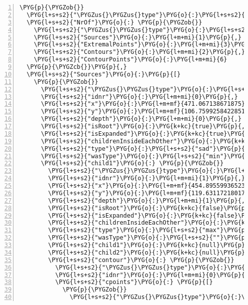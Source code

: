 \begin{Verbatim}[commandchars=\\\{\},numbers=left,stepnumber=1,codes={\catcode`\$=3\catcode`\^=7\catcode`\_=8}]
\PYG{p}{\PYGZob{}}
  \PYG{l+s+s2}{"\PYGZus{}\PYGZus{}type"}\PYG{o}{:}\PYG{l+s+s2}{"model"}\PYG{p}{,}
  \PYG{l+s+s2}{"NrOf"}\PYG{o}{:} \PYG{p}{\PYGZob{}}
    \PYG{l+s+s2}{"\PYGZus{}\PYGZus{}type"}\PYG{o}{:}\PYG{l+s+s2}{"counters"}\PYG{p}{,}
    \PYG{l+s+s2}{"Sources"}\PYG{o}{:}\PYG{l+m+mi}{1}\PYG{p}{,}
    \PYG{l+s+s2}{"ExtremalPoints"}\PYG{o}{:}\PYG{l+m+mi}{3}\PYG{p}{,}
    \PYG{l+s+s2}{"Contours"}\PYG{o}{:}\PYG{l+m+mi}{2}\PYG{p}{,}
    \PYG{l+s+s2}{"ContourPoints"}\PYG{o}{:}\PYG{l+m+mi}{6}
  \PYG{p}{\PYGZcb{}}\PYG{p}{,}
  \PYG{l+s+s2}{"Sources"}\PYG{o}{:}\PYG{p}{[}
    \PYG{p}{\PYGZob{}}
      \PYG{l+s+s2}{"\PYGZus{}\PYGZus{}type"}\PYG{o}{:}\PYG{l+s+s2}{"extpnt"}\PYG{p}{,}
      \PYG{l+s+s2}{"idnr"}\PYG{o}{:}\PYG{l+m+mi}{0}\PYG{p}{,}
      \PYG{l+s+s2}{"x"}\PYG{o}{:}\PYG{l+m+mf}{471.067138671875}\PYG{p}{,}
      \PYG{l+s+s2}{"y"}\PYG{o}{:}\PYG{l+m+mf}{106.75992584228516}\PYG{p}{,}
      \PYG{l+s+s2}{"depth"}\PYG{o}{:}\PYG{l+m+mi}{0}\PYG{p}{,}
      \PYG{l+s+s2}{"isRoot"}\PYG{o}{:}\PYG{k+kc}{true}\PYG{p}{,}
      \PYG{l+s+s2}{"isExpanded"}\PYG{o}{:}\PYG{k+kc}{true}\PYG{p}{,}
      \PYG{l+s+s2}{"childrenInsideEachOther"}\PYG{o}{:}\PYG{k+kc}{true}\PYG{p}{,}
      \PYG{l+s+s2}{"type"}\PYG{o}{:}\PYG{l+s+s2}{"sad"}\PYG{p}{,}
      \PYG{l+s+s2}{"wasType"}\PYG{o}{:}\PYG{l+s+s2}{"min"}\PYG{p}{,}
      \PYG{l+s+s2}{"child1"}\PYG{o}{:} \PYG{p}{\PYGZob{}}
        \PYG{l+s+s2}{"\PYGZus{}\PYGZus{}type"}\PYG{o}{:}\PYG{l+s+s2}{"extpnt"}\PYG{p}{,}
        \PYG{l+s+s2}{"idnr"}\PYG{o}{:}\PYG{l+m+mi}{1}\PYG{p}{,}
        \PYG{l+s+s2}{"x"}\PYG{o}{:}\PYG{l+m+mf}{454.8955993652344}\PYG{p}{,}
        \PYG{l+s+s2}{"y"}\PYG{o}{:}\PYG{l+m+mf}{119.63117218017578}\PYG{p}{,}
        \PYG{l+s+s2}{"depth"}\PYG{o}{:}\PYG{l+m+mi}{1}\PYG{p}{,}
        \PYG{l+s+s2}{"isRoot"}\PYG{o}{:}\PYG{k+kc}{false}\PYG{p}{,}
        \PYG{l+s+s2}{"isExpanded"}\PYG{o}{:}\PYG{k+kc}{false}\PYG{p}{,}
        \PYG{l+s+s2}{"childrenInsideEachOther"}\PYG{o}{:}\PYG{k+kc}{false}\PYG{p}{,}
        \PYG{l+s+s2}{"type"}\PYG{o}{:}\PYG{l+s+s2}{"max"}\PYG{p}{,}
        \PYG{l+s+s2}{"wasType"}\PYG{o}{:}\PYG{l+s+s2}{""}\PYG{p}{,}
        \PYG{l+s+s2}{"child1"}\PYG{o}{:}\PYG{k+kc}{null}\PYG{p}{,}
        \PYG{l+s+s2}{"child2"}\PYG{o}{:}\PYG{k+kc}{null}\PYG{p}{,}
        \PYG{l+s+s2}{"contour"}\PYG{o}{:} \PYG{p}{\PYGZob{}}
          \PYG{l+s+s2}{"\PYGZus{}\PYGZus{}type"}\PYG{o}{:}\PYG{l+s+s2}{"contour"}\PYG{p}{,}
          \PYG{l+s+s2}{"idnr"}\PYG{o}{:}\PYG{l+m+mi}{0}\PYG{p}{,}
          \PYG{l+s+s2}{"cpoints"}\PYG{o}{:} \PYG{p}{[}
            \PYG{p}{\PYGZob{}}
              \PYG{l+s+s2}{"\PYGZus{}\PYGZus{}type"}\PYG{o}{:}\PYG{l+s+s2}{"cpnt"}\PYG{p}{,}
\end{Verbatim}
